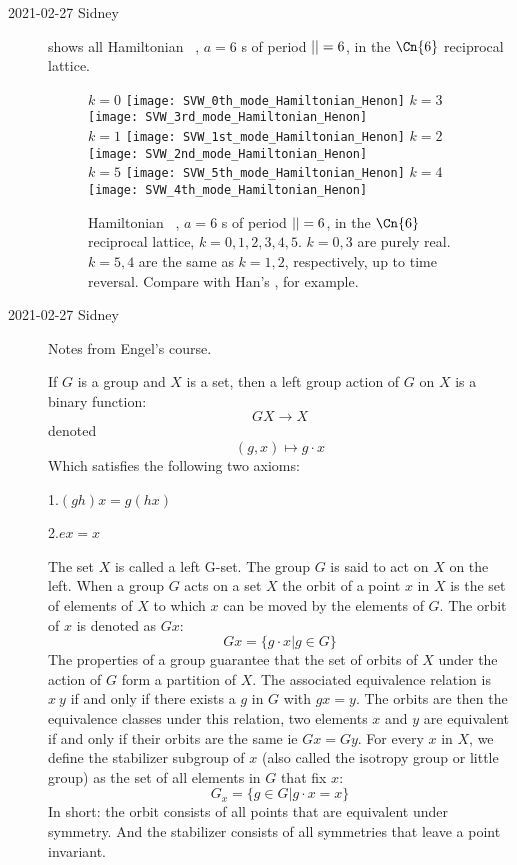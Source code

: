 \begin{description}
\item[2021-02-27 Sidney]
 shows all
Hamiltonian \Henon\ , $a=6$ {\lattstate}s of period
${||}=6$, in the $\Cn{6}$
reciprocal lattice.

\begin{figure}
  \centering
$k=0$
 \texttt{[image: SVW\_0th\_mode\_Hamiltonian\_Henon]}
$k=3$
\texttt{[image: SVW\_3rd\_mode\_Hamiltonian\_Henon]}
\\
$k=1$
\texttt{[image: SVW\_1st\_mode\_Hamiltonian\_Henon]}
$k=2$
\texttt{[image: SVW\_2nd\_mode\_Hamiltonian\_Henon]}
\\
$k=5$
\texttt{[image: SVW\_5th\_mode\_Hamiltonian\_Henon]}
$k=4$
\texttt{[image: SVW\_4th\_mode\_Hamiltonian\_Henon]}
  \caption{
Hamiltonian \Henon\ , $a=6$ {\lattstate}s of period
${||}=6$, in the $\Cn{6}$ reciprocal lattice, $k=0,1,2,3,4,5$.
$k=0,3$ are purely real.
$k=5,4$ are the same as $k=1,2$, respectively, up to time reversal.
Compare with Han's , for example.
}
\label{SVWHamHenFourier1}
\end{figure}


\item[2021-02-27 Sidney] Notes from Engel's course.

If $G$ is a group and $X$ is a set, then a left group action of $G$ on $X$ is a binary function:
$$GX\rightarrow X$$
denoted
$$(g,x)\mapsto g\cdot x$$
Which satisfies the following two axioms:

1.$(gh)x=g(hx)$

2.$ex=x$

The set $X$ is called a left G-set. The group $G$ is said to act on $X$ on the left. When a group $G$ acts on a set $X$ the orbit of a point $x$ in $X$ is the set of elements of $X$ to which $x$ can be moved by the elements of $G$. The orbit of $x$ is denoted as $Gx$:
$$Gx=\lbrace g\cdot x| g\in G\rbrace$$
The properties of a group guarantee that the set of orbits of $X$ under the action of $G$ form a partition of $X$. The associated equivalence relation is $x~y$ if and only if there exists a $g$ in $G$ with $gx=y$. The orbits are then the equivalence classes under this relation, two elements $x$ and $y$ are equivalent if and only if their orbits are the same ie $Gx=Gy$. For every $x$ in $X$, we define the stabilizer subgroup of $x$ (also called the isotropy group or little group) as the set of all elements in $G$ that fix $x$:
$$G_x=\lbrace g\in G | g\cdot x=x\rbrace$$
In short: the orbit consists of all points that are equivalent under symmetry. And the stabilizer consists of all symmetries that leave a point invariant.


\end{description}
